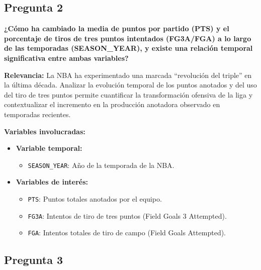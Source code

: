 \documentclass[12pt]{article}
\newcommand{\pregunta}[1]{\textbf{\large #1}}
\begin{document}
\vspace{0.3cm}


\subsection*{\pregunta{Pregunta 2}}

\textbf{¿Cómo ha cambiado la media de puntos por partido (PTS) y el porcentaje de tiros de tres puntos intentados (FG3A/FGA) a lo largo de las temporadas (SEASON\_YEAR), y existe una relación temporal significativa entre ambas variables?}

\vspace{0.3cm}

\textbf{Relevancia:}  
La NBA ha experimentado una marcada ``revolución del triple'' en la última década. Analizar la evolución temporal de los puntos anotados y del uso del tiro de tres puntos permite cuantificar la transformación ofensiva de la liga y contextualizar el incremento en la producción anotadora observado en temporadas recientes.

\vspace{0.3cm}

\textbf{Variables involucradas:}
\begin{itemize}
    \setlength\itemsep{0.1em}
    \item \textbf{Variable temporal:}
    \begin{itemize}
        \item \texttt{SEASON\_YEAR}: Año de la temporada de la NBA.
    \end{itemize}
    \item \textbf{Variables de interés:}
    \begin{itemize}
        \item \texttt{PTS}: Puntos totales anotados por el equipo.
        \item \texttt{FG3A}: Intentos de tiro de tres puntos (Field Goals 3 Attempted).
        \item \texttt{FGA}: Intentos totales de tiro de campo (Field Goals Attempted).
    \end{itemize}
\end{itemize}

\vspace{0.3cm}

\subsection*{\pregunta{Pregunta 3}}
\end{document}

